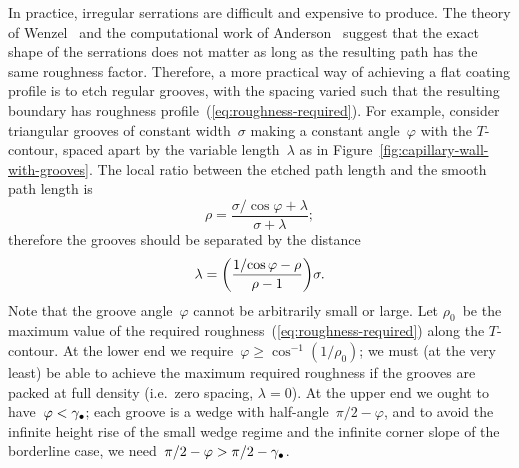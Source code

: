 In practice, irregular serrations are difficult and expensive to produce.
The theory of Wenzel~\cite{wenzel-1936-resistance-solid-surfaces-wetting}
and the computational work of Anderson~\cite[Section~6.4.5]%
  {anderson-2002-thesis-boundary-tracing-pdes}
suggest that the exact shape of the serrations does not matter
as long as the resulting path has the same roughness factor.
Therefore, a more practical way of achieving a flat coating profile
is to etch regular grooves,
with the spacing varied such that
the resulting boundary has roughness profile~(\ref{eq:roughness-required}).
For example, consider triangular grooves of constant width~$\sigma$
making a constant angle~$\varphi$ with the $T$-contour,
spaced apart by the variable length~$\lambda$
as in Figure~\ref{fig:capillary-wall-with-grooves}.
The local ratio
between the etched path length and the smooth path length
is
\begin{equation}
  \rho = \frac{\sigma / {\cos\varphi} + \lambda}{\sigma + \lambda};
  \label{eq:regular-groove-roughness}
\end{equation}
therefore the grooves should be separated by the distance
\begin{equation}
  \lambda = \roundbr*{\frac{1 / {\cos\varphi} - \rho}{\rho - 1}} \sigma.
  \label{eq:regular-groove-spacing}
\end{equation}
Note that the groove angle~$\varphi$ cannot be arbitrarily small or large.
Let $\rho_0$~be the maximum value
of the required roughness~(\ref{eq:roughness-required})
along the $T$-contour.
At the lower end we require~$\varphi \ge \cos^{-1} (1 / \rho_0)$;
we must (at the very least) be able to achieve the maximum required roughness
if the grooves are packed at full density (i.e.~zero spacing, $\lambda = 0$).
At the upper end we ought to have~$\varphi < \gamma_\bullet$;
each groove is a wedge with half-angle~$\pi/2 - \varphi$,
and to avoid the infinite height rise of the small wedge regime
and the infinite corner slope of the borderline case,
we need~$\pi/2 - \varphi > \pi/2 - \gamma_\bullet$.

